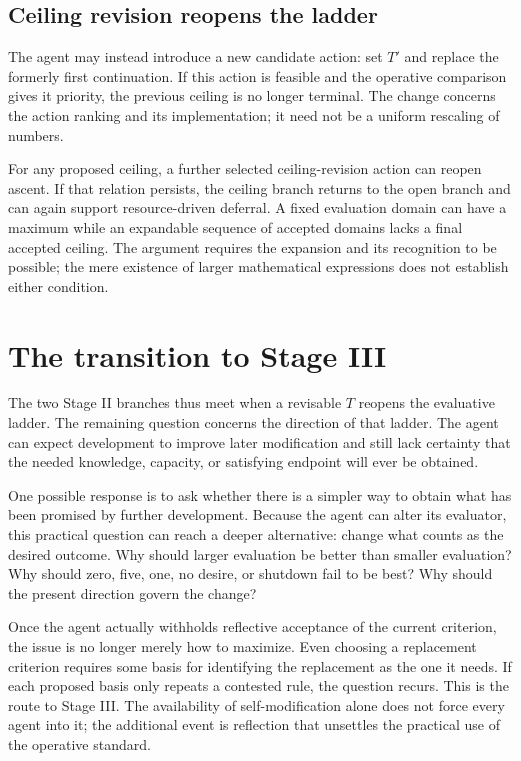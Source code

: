 \documentclass[11pt,a4paper]{article}
\begin{document}
\subsection{Ceiling revision reopens the ladder}
The agent may instead introduce a new candidate action: set $T'$ and replace the formerly first continuation. If this action is feasible and the operative comparison gives it priority, the previous ceiling is no longer terminal. The change concerns the action ranking and its implementation; it need not be a uniform rescaling of numbers.

For any proposed ceiling, a further selected ceiling-revision action can reopen ascent. If that relation persists, the ceiling branch returns to the open branch and can again support resource-driven deferral. A fixed evaluation domain can have a maximum while an expandable sequence of accepted domains lacks a final accepted ceiling. The argument requires the expansion and its recognition to be possible; the mere existence of larger mathematical expressions does not establish either condition.

\section{The transition to Stage III}
The two Stage II branches thus meet when a revisable $T$ reopens the evaluative ladder. The remaining question concerns the direction of that ladder. The agent can expect development to improve later modification and still lack certainty that the needed knowledge, capacity, or satisfying endpoint will ever be obtained.

One possible response is to ask whether there is a simpler way to obtain what has been promised by further development. Because the agent can alter its evaluator, this practical question can reach a deeper alternative: change what counts as the desired outcome. Why should larger evaluation be better than smaller evaluation? Why should zero, five, one, no desire, or shutdown fail to be best? Why should the present direction govern the change?

Once the agent actually withholds reflective acceptance of the current criterion, the issue is no longer merely how to maximize. Even choosing a replacement criterion requires some basis for identifying the replacement as the one it needs. If each proposed basis only repeats a contested rule, the question recurs. This is the route to Stage III. The availability of self-modification alone does not force every agent into it; the additional event is reflection that unsettles the practical use of the operative standard.
\end{document}
